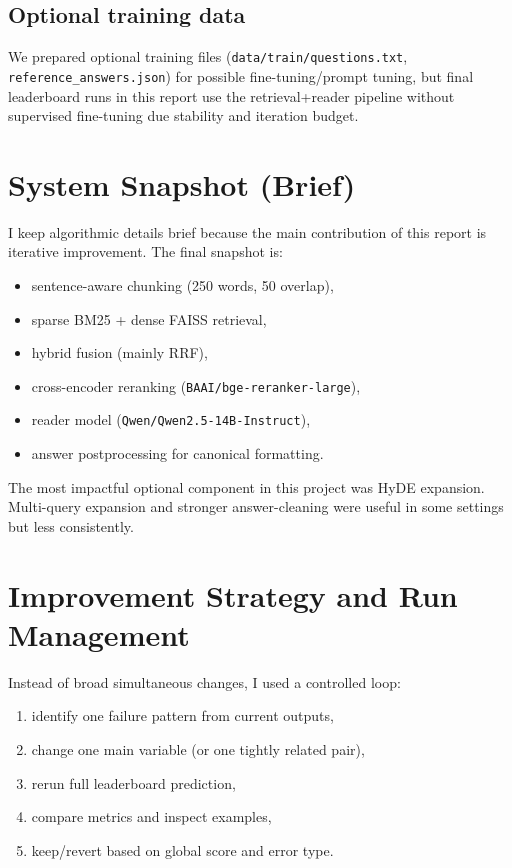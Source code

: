 \documentclass[11pt,twocolumn]{article}
\begin{document}
\subsection{Optional training data}
We prepared optional training files (\texttt{data/train/questions.txt}, \texttt{reference\_answers.json}) for possible fine-tuning/prompt tuning, but final leaderboard runs in this report use the retrieval+reader pipeline without supervised fine-tuning due stability and iteration budget.

\section{System Snapshot (Brief)}
I keep algorithmic details brief because the main contribution of this report is iterative improvement. The final snapshot is:
\begin{itemize}
    \item sentence-aware chunking (250 words, 50 overlap),
    \item sparse BM25 + dense FAISS retrieval,
    \item hybrid fusion (mainly RRF),
    \item cross-encoder reranking (\texttt{BAAI/bge-reranker-large}),
    \item reader model (\texttt{Qwen/Qwen2.5-14B-Instruct}),
    \item answer postprocessing for canonical formatting.
\end{itemize}
The most impactful optional component in this project was HyDE expansion. Multi-query expansion and stronger answer-cleaning were useful in some settings but less consistently.

\section{Improvement Strategy and Run Management}
Instead of broad simultaneous changes, I used a controlled loop:
\begin{enumerate}
    \item identify one failure pattern from current outputs,
    \item change one main variable (or one tightly related pair),
    \item rerun full leaderboard prediction,
    \item compare metrics and inspect examples,
    \item keep/revert based on global score and error type.
\end{enumerate}
\end{document}
